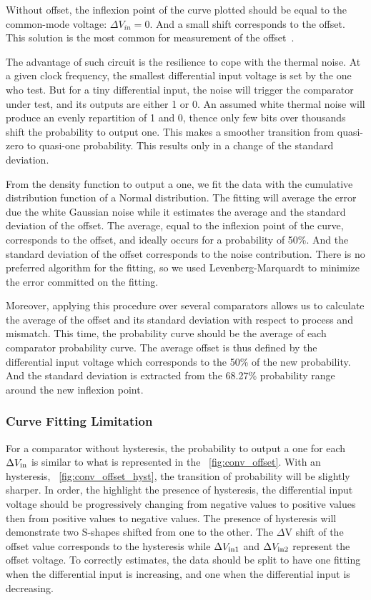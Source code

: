 Without offset, the inflexion point of the curve plotted should be equal to the common-mode voltage: $\Delta V_{in} = 0$. And a small shift corresponds to the offset. This solution is the most common for measurement of the offset~\cite{4395036,6482245,6644886}.

The advantage of such circuit is the resilience to cope with the thermal noise. At a given clock frequency, the smallest differential input voltage is set by the one who test. But for a tiny differential input, the noise will trigger the comparator under test, and its outputs are either 1 or 0. An assumed white thermal noise will produce an evenly repartition of 1 and 0, thence only few bits over thousands shift the probability to output one. This makes a smoother transition from quasi-zero to quasi-one probability. This results only in a change of the standard deviation.

From the density function to output a one, we fit the data with the cumulative distribution function of a Normal distribution. The fitting will average the error due the white Gaussian noise while it estimates the average and the standard deviation of the offset. The average, equal to the inflexion point of the curve, corresponds to the offset, and ideally occurs for a probability of 50\%. And the standard deviation of the offset corresponds to the noise contribution. There is no preferred algorithm for the fitting, so we used Levenberg-Marquardt to minimize the error committed on the fitting.

Moreover, applying this procedure over several comparators allows us to calculate the average of the offset and its standard deviation with respect to process and mismatch. This time, the probability curve should be the average of each comparator probability curve. The average offset is thus defined by the differential input voltage which corresponds to the 50\% of the new probability. And the standard deviation is extracted from the 68.27\% probability range around the new inflexion point.

\subsubsection{Curve Fitting Limitation}
For a comparator without hysteresis, the probability to output a one for each $\Delta V_{\rm in}$ is similar to what is represented in the \figurename~\ref{fig:conv_offset}. With an hysteresis, \figurename~\ref{fig:conv_offset_hyst}, the transition of probability will be slightly sharper. In order, the highlight the presence of hysteresis, the differential input voltage should be progressively changing from negative values to positive values then from positive values to negative values. The presence of hysteresis will demonstrate two S-shapes shifted from one to the other. The $\Delta$V shift of the offset value corresponds to the hysteresis while $\Delta V_{\rm in1}$ and $\Delta V_{\rm in2}$ represent the offset voltage. To correctly estimates, the data should be split to have one fitting when the differential input is increasing, and one when the differential input is decreasing.

